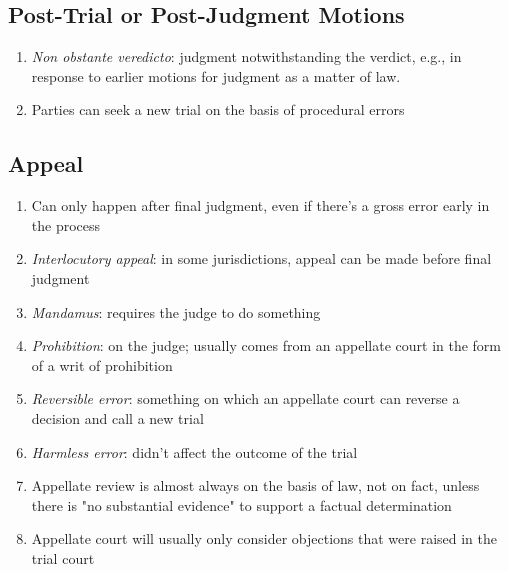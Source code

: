 \subsection{Post-Trial or Post-Judgment Motions}

\begin{enumerate}
    \item \emph{Non obstante veredicto}: judgment notwithstanding the verdict, e.g., in response to earlier motions for judgment as a matter of law.
    \item Parties can seek a new trial on the basis of procedural errors
\end{enumerate}

\subsection{Appeal}

\begin{enumerate}
    \item Can only happen after final judgment, even if there's a gross error early in the process
    \item \emph{Interlocutory appeal}: in some jurisdictions, appeal can be made before final judgment
    \item \emph{Mandamus}: requires the judge to do something
    \item \emph{Prohibition}: on the judge; usually comes from an appellate court in the form of a writ of prohibition
    \item \emph{Reversible error}: something on which an appellate court can reverse a decision and call a new trial
    \item \emph{Harmless error}: didn't affect the outcome of the trial
    \item Appellate review is almost always on the basis of law, not on fact, unless there is "no substantial evidence" to support a factual determination
    \item Appellate court will usually only consider objections that were raised in the trial court
\end{enumerate}
